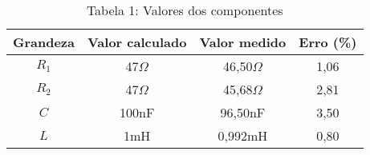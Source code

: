 \vspace{5pt}
\begin{table}[h]
\centering
\begin{tabular}{|c|c|c|c|}
\hline
\textbf{Grandeza} & \textbf{Valor calculado} & \textbf{Valor medido} & \textbf{Erro (\%) }\\\hline
$R_1$ & 47$\Omega$ & 46,50$\Omega$ & 1,06\\\hline
$R_2$ & 47$\Omega$ & 45,68$\Omega$ & 2,81 \\\hline
$C$ & 100nF & 96,50nF & 3,50 \\\hline
$L$ & 1mH & 0,992mH & 0,80\\\hline
\end{tabular}
\caption*{Tabela 1: Valores dos componentes}
\end{table}